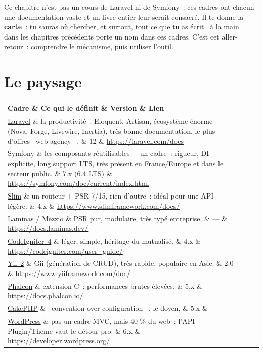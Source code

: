 \documentclass[12pt,a4paper,twoside,openright]{book}
\makeatletter
\newcommand{\link}[2]{\href{#2}{#1}}
\newenvironment{tabz}[1]{\rowcolors{2}{white}{tralight}%
  \small\setlength{\tabcolsep}{5pt}\setlength{\LTpre}{3pt}\setlength{\LTpost}{3pt}%
  \begin{longtable}{@{}#1@{}}\toprule}
  {\bottomrule\end{longtable}\normalfont\setlength{\tabcolsep}{6pt}}
\newcommand{\thd}[1]{\textbf{\color{white}#1}}
\newcommand{\headrow}{\rowcolor{theadbg}}
\makeatother
\begin{document}
\begin{note}
Ce chapitre n'est pas un cours de Laravel ni de Symfony~: ces cadres ont chacun une
documentation vaste et un livre entier leur serait consacr\'e. Il te donne la \textbf{carte}~:
tu sauras o\`u chercher, et surtout, tout ce que tu as \'ecrit \og ~\`a la main~ \fg{} dans les chapitres
pr\'ec\'edents porte un nom dans ces cadres. C'est cet aller-retour~: comprendre le m\'ecanisme,
puis utiliser l'outil.
\end{note}

\section{Le paysage}

\begin{tabz}{lXll}
  \headrow \thd{Cadre} \& \thd{Ce qui le d\'efinit} \& \thd{Version} \& \thd{Lien} \\
  \midrule
  \link{Laravel}{https://laravel.com/} \& la productivit\'e~: Eloquent, Artisan, \'ecosyst\`eme \'enorme (Nova, Forge, Livewire, Inertia), tr\`es bonne documentation, le plus d'offres \og ~web agency~ \fg{}. \& 12 \& \url{https://laravel.com/docs} \\
  \link{Symfony}{https://symfony.com/} \& les composants r\'eutilisables + un cadre~: rigueur, DI explicite, long support LTS, tr\`es pr\'esent en France/Europe et dans le secteur public. \& 7.x (6.4 LTS) \& \url{https://symfony.com/doc/current/index.html} \\
  \link{Slim}{https://www.slimframework.com/} \& un routeur + PSR-7/15, rien d'autre~: id\'eal pour une API l\'eg\`ere. \& 4.x \& \url{https://www.slimframework.com/docs/} \\
  \link{Laminas / Mezzio}{https://mezzio.dev/} \& PSR pur, modulaire, tr\`es typ\'e entreprise. \& --- \& \url{https://docs.laminas.dev/} \\
  \link{CodeIgniter~4}{https://codeigniter.com/} \& l\'eger, simple, h\'eritage du mutualis\'e. \& 4.x \& \url{https://codeigniter.com/user_guide/} \\
  \link{Yii~2}{https://www.yiiframework.com/} \& Gii (g\'en\'eration de CRUD), tr\`es rapide, populaire en Asie. \& 2.0 \& \url{https://www.yiiframework.com/doc/} \\
  \link{Phalcon}{https://phalcon.io/} \& extension C~: performances brutes \'elev\'ees. \& 5.x \& \url{https://docs.phalcon.io/} \\
  \link{CakePHP}{https://book.cakephp.org/} \& \og ~convention over configuration~ \fg{}, le doyen. \& 5.x \& \\
  \link{WordPress}{https://wordpress.org/develop/} \& pas un cadre MVC, mais 40 \% du web~: l'API Plugin/Theme vaut le d\'etour pro. \& 6.x \& \url{https://developer.wordpress.org/} \\
\end{tabz}
\end{document}
